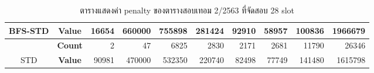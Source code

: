 \begin{table}[]
{\begin{tabular}{@{}ccrrrrrrrr@{}}
    \multirow{-2}{*}{BFS-STD}                    & \textbf{Value}                        & 16654                       & 660000                        & 755898                        & 281424                        & 92910                         & 58957                         & 100836                        & 1966679                        \\ \midrule
                                                 & \textbf{Count}                        & 2                           & 47                            & 6825                          & 2830                          & 2171                          & 2681                          & 11790                         & 26346                          \\ \cmidrule(l){2-10} 
    \multirow{-2}{*}{STD}                        & \textbf{Value}                        & 90981                       & 470000                        & 532350                        & 220740                        & 82498                         & 77749                         & 141480                        & 1615798                        \\ \bottomrule
    \end{tabular}%
    }
    \caption{ตารางแสดงค่า penalty ของตารางสอบเทอม 2/2563 ที่จัดสอบ 28 slot}
    \label{tab:result_table_263_28}
\end{table}